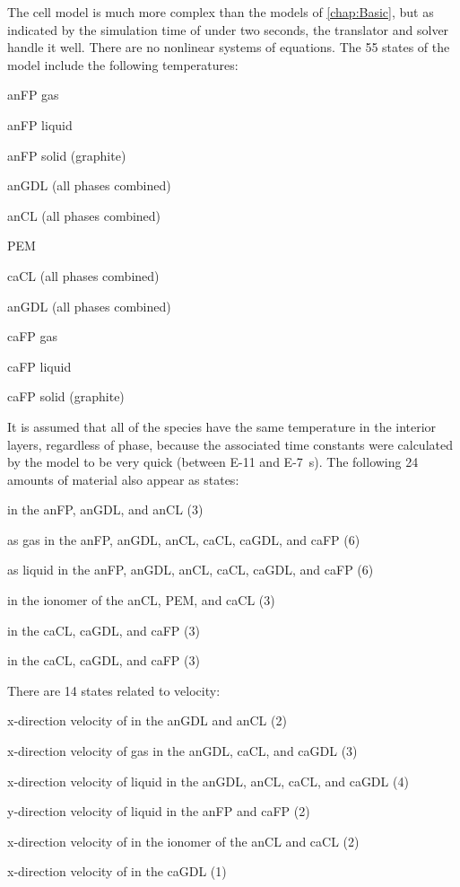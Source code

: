 The cell model is much more complex than the models of \autoref{chap:Basic}, but as indicated by the simulation time of under two seconds, the translator and solver handle it well.  There are no nonlinear systems of equations.  The 55 states of the model include the following temperatures:
\begin{enumerate*}
  \item anFP gas
  \item anFP liquid
  \item anFP solid (graphite)
  \item anGDL (all phases combined)
  \item anCL (all phases combined)
  \item PEM
  \item caCL (all phases combined)
  \item anGDL (all phases combined)
  \item caFP gas
  \item caFP liquid
  \item caFP solid (graphite)
\end{enumerate*}
It is assumed that all of the species have the same temperature in the interior layers, regardless of phase, because the associated time constants were calculated by the model to be very quick (between \num{E-11} and \SI{E-7}{s}).  The following 24 amounts of material also appear as states:
\begin{enumerate*}
  \item {} in the anFP, anGDL, and anCL (3)
  \item {} as gas in the anFP, anGDL, anCL, caCL, caGDL, and caFP (6)
  \item {} as liquid in the anFP, anGDL, anCL, caCL, caGDL, and caFP (6)
  \item {} in the ionomer of the anCL, PEM, and caCL (3)
  \item {} in the caCL, caGDL, and caFP (3)
  \item {} in the caCL, caGDL, and caFP (3)
\end{enumerate*}
There are 14 states related to velocity:
\begin{enumerate*}
  \item x-direction velocity of  in the anGDL and anCL (2)
  \item x-direction velocity of  gas in the anGDL, caCL, and caGDL (3)
  \item x-direction velocity of  liquid in the anGDL, anCL, caCL, and caGDL (4)
  \item y-direction velocity of  liquid in the anFP and caFP (2)
  \item x-direction velocity of  in the ionomer of the anCL and caCL (2)
  \item x-direction velocity of  in the caGDL (1)
\end{enumerate*}
